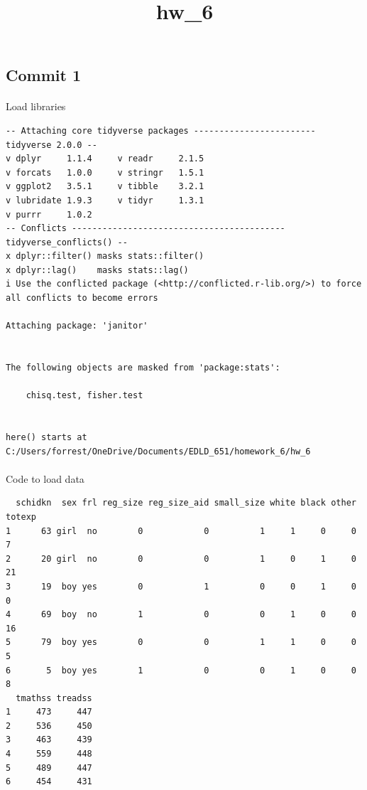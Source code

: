 \documentclass[
  letterpaper,
  DIV=11,
  numbers=noendperiod]{scrartcl}
\title{hw\_6}
\author{}
\date{}
\makeatletter
\let\oldparagraph\paragraph
\renewcommand{\paragraph}{
    \@ifstar
      \xxxParagraphStar
      \xxxParagraphNoStar
  }
\newcommand{\xxxParagraphStar}[1]{\oldparagraph*{#1}\mbox{}}
\newcommand{\xxxParagraphNoStar}[1]{\oldparagraph{#1}\mbox{}}
\makeatother
\begin{document}
\maketitle


\subsection{Commit 1}\label{commit-1}

\paragraph{Load libraries}\label{load-libraries}

\begin{verbatim}
-- Attaching core tidyverse packages ------------------------ tidyverse 2.0.0 --
v dplyr     1.1.4     v readr     2.1.5
v forcats   1.0.0     v stringr   1.5.1
v ggplot2   3.5.1     v tibble    3.2.1
v lubridate 1.9.3     v tidyr     1.3.1
v purrr     1.0.2     
-- Conflicts ------------------------------------------ tidyverse_conflicts() --
x dplyr::filter() masks stats::filter()
x dplyr::lag()    masks stats::lag()
i Use the conflicted package (<http://conflicted.r-lib.org/>) to force all conflicts to become errors

Attaching package: 'janitor'


The following objects are masked from 'package:stats':

    chisq.test, fisher.test


here() starts at C:/Users/forrest/OneDrive/Documents/EDLD_651/homework_6/hw_6
\end{verbatim}

\paragraph{Code to load data}\label{code-to-load-data}

\begin{verbatim}
  schidkn  sex frl reg_size reg_size_aid small_size white black other totexp
1      63 girl  no        0            0          1     1     0     0      7
2      20 girl  no        0            0          1     0     1     0     21
3      19  boy yes        0            1          0     0     1     0      0
4      69  boy  no        1            0          0     1     0     0     16
5      79  boy yes        0            0          1     1     0     0      5
6       5  boy yes        1            0          0     1     0     0      8
  tmathss treadss
1     473     447
2     536     450
3     463     439
4     559     448
5     489     447
6     454     431
\end{verbatim}
\end{document}
